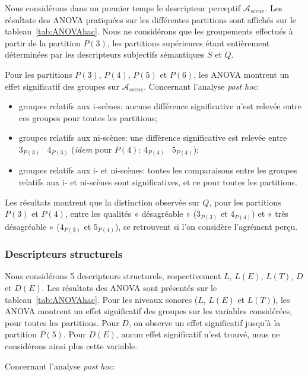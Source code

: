 Nous considérons dans un premier temps le descripteur perceptif $\mathcal{A}_{scene}$. Les résultats des ANOVA pratiquées sur les différentes partitions sont affichés sur le tableau~\ref{tab:ANOVAhac}. Nous ne considérons que les groupements effectués à partir de la partition $P(3)$, les partitions supérieures étant entièrement déterminées par les descripteurs subjectifs sémantiques $S$ et $Q$. 

Pour les partitions $P(3)$, $P(4)$, $P(5)$ et $P(6)$, les ANOVA montrent un effet significatif des groupes sur $\mathcal{A}_{scene}$. Concernant l'analyse \emph{post hoc}:

\begin{itemize}
\item groupes relatifs aux i-scènes: aucune différence significative n'est relevée entre ces groupes pour toutes les partitions;
\item groupes relatifs aux ni-scènes: une différence significative est relevée entre $3_{P(3)}$ \vs~$4_{P(3)}$ (\emph{idem} pour $P(4)$: $4_{P(4)}$ \vs~$5_{P(4)}$); 
\item groupes relatifs aux i- et ni-scènes: toutes les comparaisons entre les groupes relatifs aux i- et ni-scènes sont significatives, et ce pour toutes les partitions. 
\end{itemize}

Les résultats montrent que la distinction observée sur $Q$, pour les partitions $P(3)$ et $P(4)$, entre les qualités « désagréable » ($3_{P(3)}$ et $4_{P(4)}$) et « très désagréable » ($4_{P(3)}$ et $5_{P(4)}$), se retrouvent si l'on considère l'agrément perçu. \\

\subsubsection{Descripteurs structurels}

Nous considérons 5 descripteurs structurels, respectivement $L$, $L(E)$, $L(T)$, $D$ et $D(E)$. Les résultats des ANOVA sont présentés sur le tableau~\ref{tab:ANOVAhac}. Pour les niveaux sonores ($L$, $L(E)$ et $L(T)$), les ANOVA montrent un effet significatif des groupes sur les variables considérées, pour toutes les partitions. Pour $D$, on observe un effet significatif jusqu’à la partition $P(5)$. Pour $D(E)$, aucun effet significatif n'est trouvé, nous ne considérons ainsi plus cette variable.

Concernant l'analyse \emph{post hoc}:


